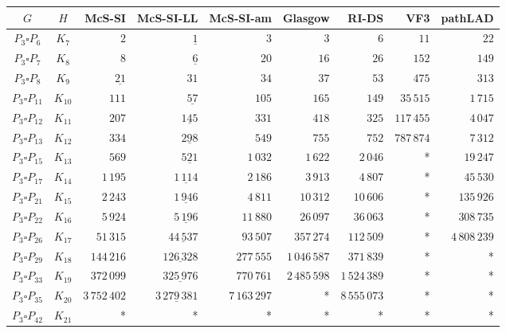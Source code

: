 
\begin{tabular}{ccrrrrrrr}
    \toprule
    {$G$} & {$H$} & {McS-SI} & {McS-SI-LL} & {McS-SI-am} & Glasgow & RI-DS & VF3 & pathLAD \\ 
    \midrule

$P_3\square P_{6}$ & $K_{7}$ & $2$ & $\underline{1}$ & $3$ & $3$ & $6$ & $11$ & $22$\\
$P_3\square P_{7}$ & $K_{8}$ & $8$ & $\underline{6}$ & $20$ & $16$ & $26$ & $152$ & $149$\\
$P_3\square P_{8}$ & $K_{9}$ & $\underline{21}$ & $31$ & $34$ & $37$ & $53$ & $475$ & $313$\\
$P_3\square P_{11}$ & $K_{10}$ & $111$ & $\underline{57}$ & $105$ & $165$ & $149$ & $35\,515$ & $1\,715$\\
$P_3\square P_{12}$ & $K_{11}$ & $207$ & $\underline{145}$ & $331$ & $418$ & $325$ & $117\,455$ & $4\,047$\\
$P_3\square P_{13}$ & $K_{12}$ & $334$ & $\underline{298}$ & $549$ & $755$ & $752$ & $787\,874$ & $7\,312$\\
$P_3\square P_{15}$ & $K_{13}$ & $569$ & $\underline{521}$ & $1\,032$ & $1\,622$ & $2\,046$ & * & $19\,247$\\
$P_3\square P_{17}$ & $K_{14}$ & $1\,195$ & $\underline{1\,114}$ & $2\,186$ & $3\,913$ & $4\,807$ & * & $45\,530$\\
$P_3\square P_{21}$ & $K_{15}$ & $2\,243$ & $\underline{1\,946}$ & $4\,811$ & $10\,312$ & $10\,606$ & * & $135\,926$\\
$P_3\square P_{22}$ & $K_{16}$ & $5\,924$ & $\underline{5\,196}$ & $11\,880$ & $26\,097$ & $36\,063$ & * & $308\,735$\\
$P_3\square P_{26}$ & $K_{17}$ & $51\,315$ & $\underline{44\,537}$ & $93\,507$ & $357\,274$ & $112\,509$ & * & $4\,808\,239$\\
$P_3\square P_{29}$ & $K_{18}$ & $144\,216$ & $\underline{126\,328}$ & $277\,555$ & $1\,046\,587$ & $371\,839$ & * & *\\
$P_3\square P_{33}$ & $K_{19}$ & $372\,099$ & $\underline{325\,976}$ & $770\,761$ & $2\,485\,598$ & $1\,524\,389$ & * & *\\
$P_3\square P_{35}$ & $K_{20}$ & $3\,752\,402$ & $\underline{3\,279\,381}$ & $7\,163\,297$ & * & $8\,555\,073$ & * & *\\
$P_3\square P_{42}$ & $K_{21}$ & * & * & * & * & * & * & *\\

    \bottomrule
\end{tabular}

